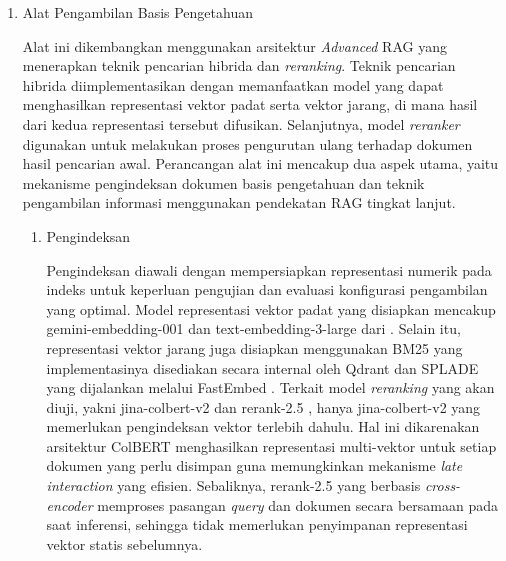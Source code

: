 \begin{enumerate}[label=\alph*., listparindent=\parindent, labelindent=0pt]
\begin{enumerate}[label=\arabic*., listparindent=\parindent, labelindent=0pt]
\begin{enumerate}[label=(\alph*), listparindent=\parindent, labelindent=0pt]
            \item \textit{Image-to-Text} \\
            Teknik ini membalikkan pendekatan lintas \textit{modal}, di mana vektor citra masukan digunakan untuk mencari kecocokan pada ruang vektor teks. Teknik ini berguna untuk memperoleh deskripsi tekstual atau label penyakit yang paling relevan secara langsung dari fitur visual.
        \end{enumerate}
    \end{enumerate}

    \item Alat Pengambilan Basis Pengetahuan

    Alat ini dikembangkan menggunakan arsitektur \textit{Advanced} RAG yang menerapkan teknik pencarian hibrida dan \textit{reranking}. Teknik pencarian hibrida diimplementasikan dengan memanfaatkan model yang dapat menghasilkan representasi vektor padat  serta vektor jarang, di mana hasil dari kedua representasi tersebut difusikan. Selanjutnya, model \textit{reranker} digunakan untuk melakukan proses pengurutan ulang terhadap dokumen hasil pencarian awal. Perancangan alat ini mencakup dua aspek utama, yaitu mekanisme pengindeksan dokumen basis pengetahuan dan teknik pengambilan informasi menggunakan pendekatan RAG tingkat lanjut. 

    \begin{enumerate}[label=\arabic*., listparindent=\parindent, labelindent=0pt]
        \item Pengindeksan

        Pengindeksan diawali dengan mempersiapkan representasi numerik pada indeks untuk keperluan pengujian dan evaluasi konfigurasi pengambilan yang optimal. Model representasi vektor padat yang disiapkan mencakup gemini-embedding-001 \textcite{googleGeminiEmbedding0012025} dan text-embedding-3-large dari \textcite{openaiTextEmbedding3Large2024}. Selain itu, representasi vektor jarang juga disiapkan menggunakan BM25 yang implementasinya disediakan secara internal oleh Qdrant dan SPLADE \parencite{formalSPLADESparseLexical2021} yang dijalankan melalui FastEmbed \parencite{qdrant_fastembed_2023}. Terkait model \textit{reranking} yang akan diuji, yakni jina-colbert-v2 \parencite{jhaJinaColBERTv2GeneralPurposeMultilingual2024} dan rerank-2.5 \parencite{voyageai2025rerank25}, hanya jina-colbert-v2 yang memerlukan pengindeksan vektor terlebih dahulu. Hal ini dikarenakan arsitektur ColBERT menghasilkan representasi multi-vektor untuk setiap dokumen yang perlu disimpan guna memungkinkan mekanisme \textit{late interaction} yang efisien. Sebaliknya, rerank-2.5 yang berbasis \textit{cross-encoder} memproses pasangan \textit{query} dan dokumen secara bersamaan pada saat inferensi, sehingga tidak memerlukan penyimpanan representasi vektor statis sebelumnya. 


\end{enumerate}
\end{enumerate}
